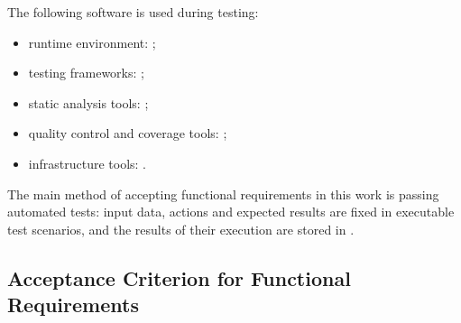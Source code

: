 \documentclass[12pt,a4paper]{extarticle}
\begin{document}
\begin{hseExample}
The following software is used during testing:

\begin{itemize}[leftmargin=1.25cm]
    \item runtime environment: ;
    \item testing frameworks: ;
    \item static analysis tools: ;
    \item quality control and coverage tools: ;
    \item infrastructure tools: .
\end{itemize}

The main method of accepting functional requirements in this work is passing automated tests: input data, actions and expected results are fixed in executable test scenarios, and the results of their execution are stored in .
\end{hseExample}

\subsection{Acceptance Criterion for Functional Requirements}
\end{document}
